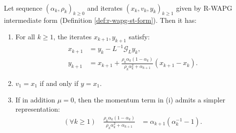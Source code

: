 \documentclass[12pt]{article}
\begin{document}
        \begin{proposition}\label{prop:r-wapg-momentum-repr}
            \;\\
            Let sequence $(\alpha_k, \rho_k)_{k \ge 0}$ and iterates $(x_k, v_k, y_k)_{k\ge 1}$ given by R-WAPG intermediate form (Definition \ref{def:r-wapg-st-form}). 
            Then it has: 
            \begin{enumerate}
                \item For all $k \ge 1$, the iterates $x_{k + 1}, y_{k + 1}$ satisfy:
                \begin{align*}
                    x_{k + 1} &= y_k - L^{-1}\mathcal G_Ly_k, 
                    \\
                    y_{k + 1} &= 
                    x_{k + 1} + 
                    \frac{\rho_k\alpha_k(1 - \alpha_k)}
                    {\rho_k\alpha_k^2 + \alpha_{k + 1}}(x_{k + 1} - x_k). 
                \end{align*}
                \item $v_1 = x_1$ if and only if $y = x_1$.  
                \item If in addition $\mu = 0$, then the momentum term in (i) admits a simpler representation: 
                \begin{align*}
                    (\forall k \ge 1) \quad 
                    \frac{\rho_k\alpha_k(1 - \alpha_k)}{\rho_k\alpha_k^2 + \alpha_{k + 1}}
                    & = \alpha_{k + 1}(\alpha_k^{-1} - 1). 
                \end{align*}
            \end{enumerate}
        \end{proposition}
\end{document}
